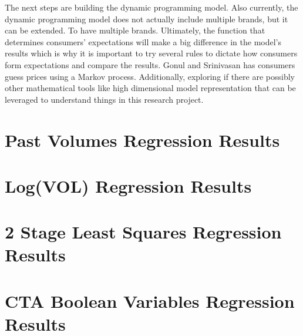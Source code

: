 \documentclass{article}
\begin{document}
The next steps are building the dynamic programming model. Also currently, the dynamic programming model does not actually include multiple brands, but it can be extended. To have multiple brands. Ultimately, the function that determines consumers' expectations will make a big difference in the model's results which is why it is important to try several rules to dictate how consumers form expectations and compare the results. Gonul and Srinivasan has consumers guess prices using a Markov process. Additionally, exploring if there are possibly other mathematical tools like high dimensional model representation that can be leveraged to understand things in this research project. 

\pagebreak

{}


\pagebreak

\begin{appendices}
\section{Past Volumes Regression Results}


\section{Log(VOL) Regression Results}


\section{2 Stage Least Squares Regression Results}


\section{CTA Boolean Variables Regression Results}



\end{appendices}
\end{document}
